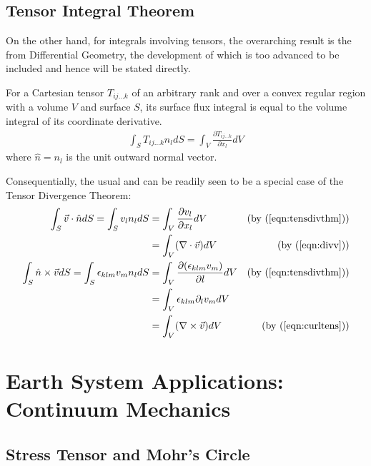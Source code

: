\subsection{Tensor Integral Theorem}

On the other hand, for integrals involving tensors, the overarching result is the  from Differential Geometry, the development of which is too advanced to be included and hence will be stated directly.
\begin{thm}
For a Cartesian tensor $T_{ij\ldots k}$ of an arbitrary rank and over a convex regular region with a volume $V$ and surface $S$, its surface flux integral is equal to the volume integral of its coordinate derivative.
\begin{align}
\int_S T_{ij\ldots k}n_l dS = \int_V \frac{\partial T_{ij\ldots k}}{\partial x_l} dV \label{eqn:tensdivthm}
\end{align}
where $\hat{n} = n_l$ is the unit outward normal vector.
\end{thm}
Consequentially, the usual  and  can be readily seen to be a special case of the Tensor Divergence Theorem:
\begin{align}
\int_S \vec{v}\cdot \hat{n} dS = \int_S v_ln_l dS &= \int_V \frac{\partial v_l}{\partial x_l} dV \nonumber &\text{(by (\ref{eqn:tensdivthm}))} \\ 
&= \int_V (\nabla \cdot \vec{v}) dV &\text{(by (\ref{eqn:divv}))} \label{eqn:divthm} \\
\int_S \hat{n} \times \vec{v} dS = \int_S \epsilon_{klm}v_mn_l dS &= \int_V \frac{\partial (\epsilon_{klm}v_m)}{\partial l} dV \nonumber &\text{(by (\ref{eqn:tensdivthm}))} \\
&= \int_V \epsilon_{klm}\partial_lv_m dV \nonumber \\
&= \int_V (\nabla \times \vec{v}) dV &\text{(by (\ref{eqn:curltens}))} \label{eqn:stokes}
\end{align}

\section{Earth System Applications: Continuum Mechanics}

\subsection{Stress Tensor and Mohr's Circle}

